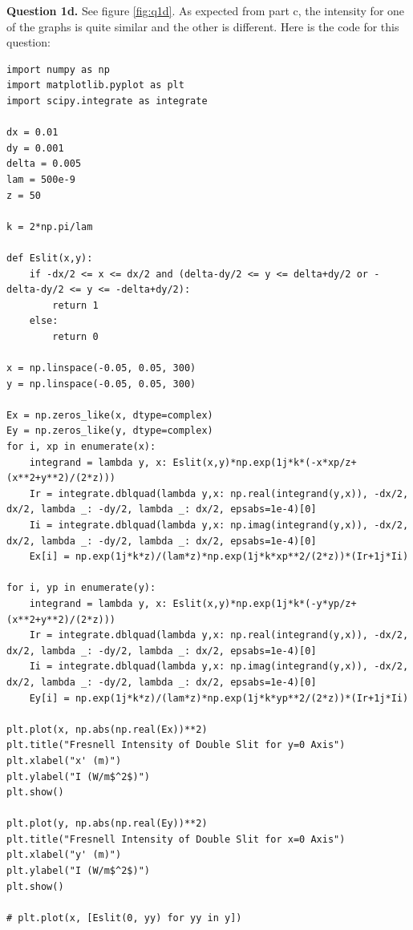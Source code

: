 \documentclass[letterpaper, reqno,11pt]{article}
\begin{document}
{\medskip\noindent\bf Question 1d.} See figure \ref{fig:q1d}. As expected from part c, the intensity for one of the graphs is quite similar and the other is different. Here is the code for this question:
\begin{lstlisting}
import numpy as np
import matplotlib.pyplot as plt
import scipy.integrate as integrate

dx = 0.01
dy = 0.001
delta = 0.005
lam = 500e-9
z = 50

k = 2*np.pi/lam

def Eslit(x,y):
    if -dx/2 <= x <= dx/2 and (delta-dy/2 <= y <= delta+dy/2 or -delta-dy/2 <= y <= -delta+dy/2):
        return 1
    else:
        return 0

x = np.linspace(-0.05, 0.05, 300)
y = np.linspace(-0.05, 0.05, 300)

Ex = np.zeros_like(x, dtype=complex)
Ey = np.zeros_like(y, dtype=complex)
for i, xp in enumerate(x):
    integrand = lambda y, x: Eslit(x,y)*np.exp(1j*k*(-x*xp/z+(x**2+y**2)/(2*z)))
    Ir = integrate.dblquad(lambda y,x: np.real(integrand(y,x)), -dx/2, dx/2, lambda _: -dy/2, lambda _: dx/2, epsabs=1e-4)[0]
    Ii = integrate.dblquad(lambda y,x: np.imag(integrand(y,x)), -dx/2, dx/2, lambda _: -dy/2, lambda _: dx/2, epsabs=1e-4)[0]
    Ex[i] = np.exp(1j*k*z)/(lam*z)*np.exp(1j*k*xp**2/(2*z))*(Ir+1j*Ii)

for i, yp in enumerate(y):
    integrand = lambda y, x: Eslit(x,y)*np.exp(1j*k*(-y*yp/z+(x**2+y**2)/(2*z)))
    Ir = integrate.dblquad(lambda y,x: np.real(integrand(y,x)), -dx/2, dx/2, lambda _: -dy/2, lambda _: dx/2, epsabs=1e-4)[0]
    Ii = integrate.dblquad(lambda y,x: np.imag(integrand(y,x)), -dx/2, dx/2, lambda _: -dy/2, lambda _: dx/2, epsabs=1e-4)[0]
    Ey[i] = np.exp(1j*k*z)/(lam*z)*np.exp(1j*k*yp**2/(2*z))*(Ir+1j*Ii)

plt.plot(x, np.abs(np.real(Ex))**2)
plt.title("Fresnell Intensity of Double Slit for y=0 Axis")
plt.xlabel("x' (m)")
plt.ylabel("I (W/m$^2$)")
plt.show()

plt.plot(y, np.abs(np.real(Ey))**2)
plt.title("Fresnell Intensity of Double Slit for x=0 Axis")
plt.xlabel("y' (m)")
plt.ylabel("I (W/m$^2$)")
plt.show()

# plt.plot(x, [Eslit(0, yy) for yy in y])

\end{lstlisting}
\end{document}
